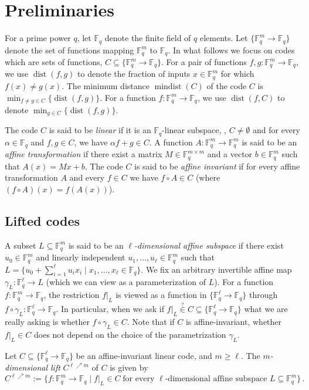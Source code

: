 \documentclass{toc}
\theoremstyle{plain}
\DeclareMathOperator{\dist}{dist} %
\DeclareMathOperator{\mindist}{mindist}  %
\newcommand{\F}{{\mathbb{F}}}
\newcommand{\Func}[1]{\{\F_q^{#1} \to \F_q\}}
\begin{document}
\section{Preliminaries}\label{sec:prelim}

%
%
%
%
For a prime power $q$, let $\F_q$ denote the finite field of $q$ elements.
Let $\Func{m}$
denote the set of functions mapping $\F_q^m$ to  $\F_q$. In what follows
we focus on codes which are
%
sets  %
of functions, %
$C \subseteq \Func{m}$. For a pair of functions $f,g: \F_q^m \to \F_q$,
we use $\dist(f,g)$ to denote the
fraction of inputs $x \in \F_q^m$ for which $f(x) \ne g(x)$.
The  %
minimum distance   %
$\mindist(C)$ of the code $C$ is $\min_{f \neq g\in C}
\{\dist(f,g)\}$. For a function $f: \F_q^m \to \F_q$,
we use $\dist(f,C)$ to denote $\min_{g \in C}
\{\dist(f,g)\}$.  %

The code $C$ is said to be \emph{linear}
if it is an $\F_q$-linear subspace, 
%
%
%
\ie, $C\neq\emptyset$ and %
for every $\alpha \in \F_q$ and $f,g \in C$, we
have $\alpha f + g \in C$.   %
A function $A:\F_q^m \to \F_q^m$
is said to be an \emph{affine transformation} if there exist a matrix $M \in \F_q^{m \times m}$
and  a vector $b \in \F_q^m$ such that $A(x) = Mx + b$.
The code $C$ is said to be \emph{affine invariant} %
if for every affine transformation $A$ and every $f \in C$
we have $f \circ A \in C$ (where $(f \circ A)(x) = f(A(x))$).

\subsection{Lifted codes}

A subset $L \subseteq \F_q^m$
is said to be an \emph{$\ell$-dimensional affine subspace} if there
exist
%
%
%
%
$u_0 \in \F_q^m$ and linearly independent $u_1,\ldots,u_\ell \in \F_q^m$ such that
%
$L = \{u_0 + \sum_{i=1}^\ell u_i x_i \mid x_1,\ldots,x_\ell \in \F_q\}$.   %
%
%
%
We fix an arbitrary %
invertible  %
affine map $\gamma_L:\F_q^\ell\to L$ (which we can view as a parameterization of $L$). For a function $f:\F_q^m \to \F_q$, the restriction $f|_L$ is viewed as a function in $\{\F_q^\ell \to \F_q \}$ through $f\circ\gamma_L: \F_q^\ell\to\F_q$. In particular, when we ask if $f|_L \stackrel{?}\in C\subseteq \{ \F_q^\ell \to \F_q \}$ what we are really asking is whether $f\circ \gamma_L \in C$. Note that if $C$ is affine-invariant, whether $f|_L \in C$ does not depend on the choice of the parametrization $\gamma_L$.
\begin{definition}
Let $C \subseteq \Func{\ell}$ be an affine-invariant  linear code, and $m \geq \ell$. The \emph{$m$-dimensional
lift} $C^{\ell \nearrow m}$ of $C$ is given by
\[C^{\ell \nearrow m}:=\big\{f :\F_q^m \to \F_q \mid f|_L \in C \; \text{for every $\ell$-dimensional
affine subspace $L \subseteq \F_q^m$}\big\}\,.\]
\end{definition}
\end{document}

